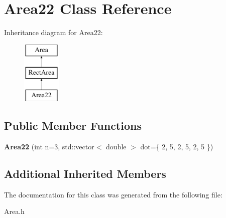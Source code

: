 \hypertarget{class_area22}{}\section{Area22 Class Reference}
\label{class_area22}
Inheritance diagram for Area22\+:\begin{figure}[H]
\begin{center}
\leavevmode
\includegraphics[height=3.000000cm]{class_area22}
\end{center}
\end{figure}
\subsection*{Public Member Functions}
\begin{DoxyCompactItemize}
\item 
\mbox{\label{class_area22_a8b5b011a3fdf3c71a8d495edc7640c4b}} 
{\bfseries Area22} (int n=3, std\+::vector$<$ double $>$ dot=\{ 2, 5, 2, 5, 2, 5 \})
\end{DoxyCompactItemize}
\subsection*{Additional Inherited Members}


The documentation for this class was generated from the following file\+:\begin{DoxyCompactItemize}
\item 
Area.\+h\end{DoxyCompactItemize}
